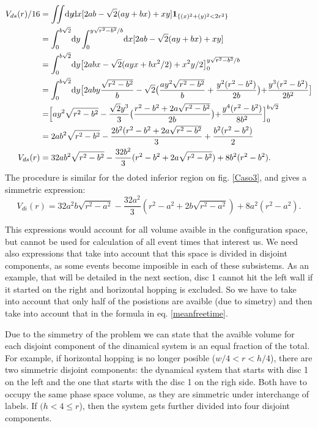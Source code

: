 \documentclass[letterpaper,10pt, jcp, aps]{revtex4-1}
\newcommand{\rd}{\!\mathrm{d}}
\newcommand{\indicator}[1]{\mathbf{1}_{ \{   #1 \} } }
\begin{document}
\begin{equation}
  \begin{split}
    V_{ds}(r) /16 &=\iint \rd y \rd x [2ab-\sqrt{2}(ay+bx)+xy] \indicator{(x)^2+(y)^2<2r^2 }\\
    &=\int_0^{b\sqrt{2}}\rd y \int_{0}^{y\sqrt{r^2-b^2}/b} \rd x [2ab-\sqrt{2}(ay+bx)+xy] \\
   &=\int_0^{b\sqrt{2}}\rd y \bigl[2abx-\sqrt{2}(ayx+bx^2/2)+x^2y/2\bigr]_{0}^{y\sqrt{r^2-b^2}/b} \\
      &=\int_0^{b\sqrt{2}}\rd y
        \bigr[
          2aby\frac{\sqrt{r^2-b^2}}{b}
          -\sqrt{2}
          \bigr(
          \frac{ay^2\sqrt{r^2-b^2}}{b}
            +\frac{y^2(r^2-b^2)}{2b}
            \bigl)
           +\frac{y^3(r^2-b^2)}{2b^2}
           \bigl]\\
        &= \Bigr[ay^2\sqrt{r^2-b^2}-
          \frac{\sqrt{2}y^3}{3}
          \bigr(
          \frac{r^2-b^2+2a\sqrt{r^2-b^2}}{2b}
            \bigl)
            +\frac{y^4(r^2-b^2)}{8b^2}
            \Bigl]_0^{b\sqrt{2}}\\
          &=2ab^2\sqrt{r^2-b^2}
          -\frac{2b^2(r^2-b^2+2a\sqrt{r^2-b^2}}{3}+\frac{b^2(r^2-b^2)}{2}\\
          V_{ds}(r)&=32ab^2\sqrt{r^2-b^2} -\frac{32
            b^2}{3}(r^2-b^2+2a\sqrt{r^2-b^2}) +8b^2(r^2-b^2).
  \end{split}
  \end{equation}
The procedure is similar for the doted inferior region on fig. \ref{Caso3},
and gives a simmetric expression:
\begin{equation}
          V_{di}(r)=32a^2b\sqrt{r^2-a^2} -\frac{32
            a^2}{3}(r^2-a^2+2b\sqrt{r^2-a^2}) +8a^2(r^2-a^2).
\end{equation}

This expressions would account for all volume avaible in the configuration space, but
cannot be used for calculation of all event times that interest us. We need also
expressions that take into account that this space is divided in disjoint components,
as some events become imposible in each of these subsistems. As an example,
that will be detailed in the next section, disc 1 cannot hit the left wall if
it started on the right and horizontal hopping is excluded. So we have to
take into account that only half of the posistions are avaible (due to simetry)
and then take into account that in the formula in eq. \ref{meanfreetime}.

Due to the simmetry of the problem we can state that the avaible volume
for each disjoint component of the dinamical system is an equal fraction
of the total. For example, if horizontal hopping is no longer posible
($w/4<r<h/4$), there are two simmetric disjoint components: the dynamical system
that starts with disc 1 on the left and the one that starts with the disc 1 on
the righ side. Both have to occupy the same phase space volume, as they are
simmetric under interchange of labels. If $(h<4\leq r$), then the system gets further
divided into four disjoint components. 
\end{document}
